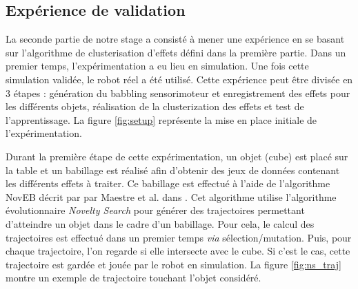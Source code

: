 \documentclass{llncs}
\newcommand*\circled[1]{\tikz[baseline=(char.base)]{
            \node[shape=circle,draw,inner sep=2pt] (char) {#1};}}
\begin{document}
\subsection{Expérience de validation}
La seconde partie de notre stage a consisté à mener une expérience en se basant sur l'algorithme de clusterisation d'effets défini dans la première partie. Dans un premier temps, l'expérimentation a eu lieu en simulation. Une fois cette simulation validée, le robot réel a été utilisé. Cette expérience peut être divisée en 3 étapes : \circled{1} génération du babbling sensorimoteur et enregistrement des effets pour les différents objets, \circled{2} réalisation de la clusterization des effets et \circled{3} test de l'apprentissage.  La figure \ref{fig:setup} représente la mise en place initiale de l'expérimentation.

Durant la première étape de cette expérimentation, un objet (cube) est placé sur la table et un babillage est réalisé afin d'obtenir des jeux de données contenant les différents effets à traiter. Ce babillage est effectué à l'aide de l'algorithme NovEB décrit par par Maestre et al. dans \cite{Maestre2015}. Cet algorithme utilise l'algorithme évolutionnaire \textit{Novelty Search}\cite{5949955} pour générer des trajectoires permettant d'atteindre un objet dans le cadre d'un babillage. Pour cela, le calcul des trajectoires est effectué dans un premier temps \textit{via} sélection/mutation. Puis, pour chaque trajectoire, l'on regarde si elle intersecte avec le cube. Si c'est le cas, cette trajectoire est gardée et jouée par le robot en simulation. La figure \ref{fig:ns_traj} montre un exemple de trajectoire touchant l'objet considéré.
\end{document}
